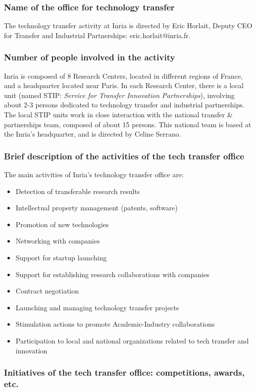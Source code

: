\documentclass[12pt,a4paper,twoside]{article}
\begin{document}
\subsubsection{Name of the office for technology transfer}
The technology transfer activity at Inria is directed by Eric Horlait, Deputy CEO for Transfer and Industrial Partnerships: eric.horlait@inria.fr.


\subsubsection{Number of people involved in the activity }
Inria is composed of 8 Research Centers, located in different regions of France, and a headquarter located near Paris. In each Research Center, there is a local unit (named STIP: \textit{Service for Transfer Innovation Partnerships}), involving about 2-3 persons dedicated to technology transfer and industrial partnerships.
The local STIP units work in close interaction with the national transfer \& partnerships team, composed of about 15 persons. This national team is based at the Inria's headquarter, and is directed by Celine Serrano.

\subsubsection{Brief description of the activities of the tech transfer office}
The main activities of Inria’s technology transfer office are:
\begin{itemize}
\item Detection of transferable research results
\item Intellectual property management (patents, software)
\item Promotion of new technologies
\item Networking with companies
\item Support for startup launching
\item Support for establishing research collaborations with companies
\item Contract negotiation
\item Launching and managing technology transfer projects
\item Stimulation actions to promote Academic-Industry collaborations
\item Participation to local and national organizations related to tech transfer and innovation
\end{itemize}

\subsubsection{Initiatives of the tech transfer office: competitions, awards, etc.}
\end{document}
